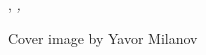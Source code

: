 \thispagestyle{empty}

\hfill

\vfill

\noindent\myName, \textit{\myTitle,} %
\myTime

\noindent Cover image by Yavor Milanov


%
%
%
%
%
